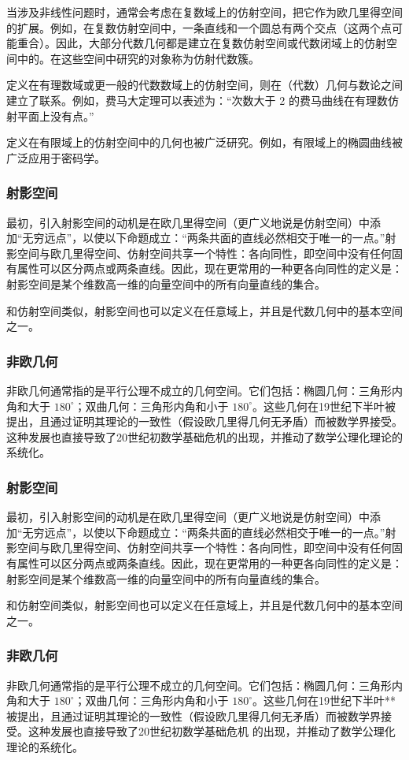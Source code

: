 当涉及非线性问题时，通常会考虑在复数域上的仿射空间，把它作为欧几里得空间的扩展。例如，在复数仿射空间中，一条直线和一个圆总有两个交点（这两个点可能重合）。因此，大部分代数几何都是建立在复数仿射空间或代数闭域上的仿射空间中的。在这些空间中研究的对象称为仿射代数簇。

定义在有理数域或更一般的代数数域上的仿射空间，则在（代数）几何与数论之间建立了联系。例如，费马大定理可以表述为：“次数大于 2 的费马曲线在有理数仿射平面上没有点。”

定义在有限域上的仿射空间中的几何也被广泛研究。例如，有限域上的椭圆曲线被广泛应用于密码学。
\subsubsection{射影空间}
最初，引入射影空间的动机是在欧几里得空间（更广义地说是仿射空间）中添加“无穷远点”，以使以下命题成立：“两条共面的直线必然相交于唯一的一点。”射影空间与欧几里得空间、仿射空间共享一个特性：各向同性，即空间中没有任何固有属性可以区分两点或两条直线。因此，现在更常用的一种更各向同性的定义是：射影空间是某个维数高一维的向量空间中的所有向量直线的集合。

和仿射空间类似，射影空间也可以定义在任意域上，并且是代数几何中的基本空间之一。
\subsubsection{非欧几何}
非欧几何通常指的是平行公理不成立的几何空间。它们包括：椭圆几何：三角形内角和大于 $180^\circ$；双曲几何：三角形内角和小于 $180^\circ$。这些几何在19世纪下半叶被提出，且通过证明其理论的一致性（假设欧几里得几何无矛盾）而被数学界接受。这种发展也直接导致了20世纪初数学基础危机的出现，并推动了数学公理化理论的系统化。
\subsubsection{射影空间}
最初，引入射影空间的动机是在欧几里得空间（更广义地说是仿射空间）中添加“无穷远点”，以使以下命题成立：“两条共面的直线必然相交于唯一的一点。”射影空间与欧几里得空间、仿射空间共享一个特性：各向同性，即空间中没有任何固有属性可以区分两点或两条直线。因此，现在更常用的一种更各向同性的定义是：射影空间是某个维数高一维的向量空间中的所有向量直线的集合。

和仿射空间类似，射影空间也可以定义在任意域上，并且是代数几何中的基本空间之一。
\subsubsection{非欧几何}
非欧几何通常指的是平行公理不成立的几何空间。它们包括：椭圆几何：三角形内角和大于 $180^\circ$；双曲几何：三角形内角和小于 $180^\circ$。这些几何在19世纪下半叶**被提出，且通过证明其理论的一致性（假设欧几里得几何无矛盾）而被数学界接受。这种发展也直接导致了20世纪初数学基础危机 的出现，并推动了数学公理化理论的系统化。
